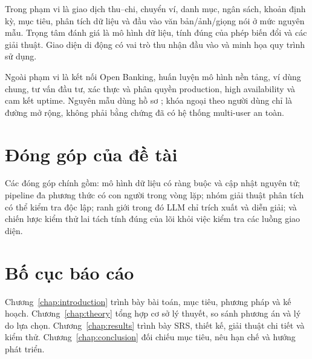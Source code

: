 Trong phạm vi là giao dịch thu--chi, chuyển ví, danh mục, ngân sách, khoản định kỳ, mục tiêu, phân tích dữ liệu và đầu vào văn bản/ảnh/giọng nói ở mức nguyên mẫu. Trọng tâm đánh giá là mô hình dữ liệu, tính đúng của phép biến đổi và các giải thuật. Giao diện di động có vai trò thu nhận đầu vào và minh họa quy trình sử dụng.

Ngoài phạm vi là kết nối Open Banking, huấn luyện mô hình nền tảng, ví dùng chung, tư vấn đầu tư, xác thực và phân quyền production, high availability và cam kết uptime. Nguyên mẫu dùng hồ sơ ; khóa ngoại theo người dùng chỉ là đường mở rộng, không phải bằng chứng đã có hệ thống multi-user an toàn.

\section{Đóng góp của đề tài}

Các đóng góp chính gồm: mô hình dữ liệu có ràng buộc và cập nhật nguyên tử; pipeline đa phương thức có con người trong vòng lặp; nhóm giải thuật phân tích có thể kiểm tra độc lập; ranh giới trong đó LLM chỉ trích xuất và diễn giải; và chiến lược kiểm thử lai tách tính đúng của lõi khỏi việc kiểm tra các luồng giao diện.

\section{Bố cục báo cáo}

Chương~\ref{chap:introduction} trình bày bài toán, mục tiêu, phương pháp và kế hoạch. Chương~\ref{chap:theory} tổng hợp cơ sở lý thuyết, so sánh phương án và lý do lựa chọn. Chương~\ref{chap:results} trình bày SRS, thiết kế, giải thuật chi tiết và kiểm thử. Chương~\ref{chap:conclusion} đối chiếu mục tiêu, nêu hạn chế và hướng phát triển.
